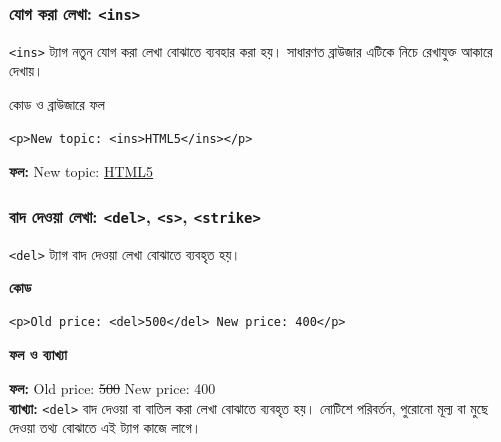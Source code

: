 \subsubsection{যোগ করা লেখা: \texttt{<ins>}}

\texttt{<ins>} ট্যাগ নতুন যোগ করা লেখা বোঝাতে ব্যবহার করা হয়। সাধারণত ব্রাউজার এটিকে নিচে রেখাযুক্ত আকারে দেখায়।

\begin{chFourWholeExample}{কোড ও ব্রাউজারে ফল}
\noindent
\begin{minipage}[t]{.50\linewidth}\vspace{0pt}

\begin{verbatim}
<p>New topic: <ins>HTML5</ins></p>
\end{verbatim}

\end{minipage}\hfill
\begin{minipage}[t]{.46\linewidth}\vspace{0pt}
\textbf{ফল:} New topic: \underline{HTML5}\\
\end{minipage}
\end{chFourWholeExample}

\subsubsection{বাদ দেওয়া লেখা: \texttt{<del>}, \texttt{<s>}, \texttt{<strike>}}

\texttt{<del>} ট্যাগ বাদ দেওয়া লেখা বোঝাতে ব্যবহৃত হয়।

\par\noindent
\begin{minipage}[t]{.54\linewidth}\vspace{0pt}\small
\textbf{\color{chFourTeal}কোড}\par
\begin{verbatim}
<p>Old price: <del>500</del> New price: 400</p>
\end{verbatim}

\par\smallskip
\end{minipage}\hfill
\begin{minipage}[t]{.42\linewidth}\vspace{0pt}\small
\textbf{\color{chFourTeal}ফল ও ব্যাখ্যা}\par
\textbf{ফল:} Old price: \sout{500} New price: 400\\
\textbf{ব্যাখ্যা:} \texttt{<del>} বাদ দেওয়া বা বাতিল করা লেখা বোঝাতে ব্যবহৃত হয়। নোটিশে পরিবর্তন, পুরোনো মূল্য বা মুছে দেওয়া তথ্য বোঝাতে এই ট্যাগ কাজে লাগে।
\par\smallskip
\end{minipage}\par



